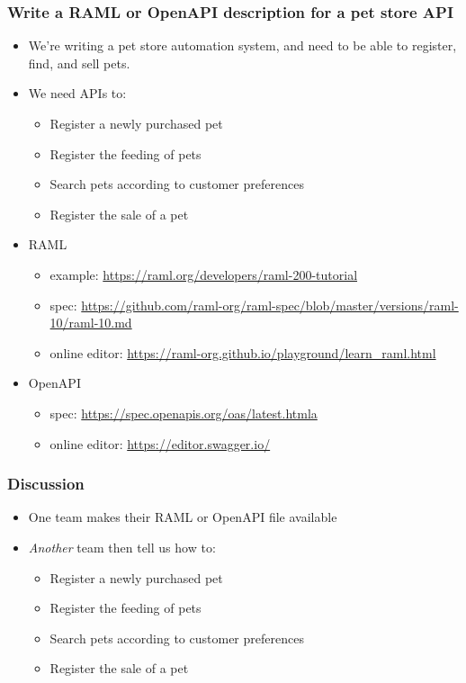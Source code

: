 \documentclass[8pt]{article}
\begin{document}
\subsubsection{Write a RAML or OpenAPI description for a pet store API}
\label{sec:org7547e2c}
\begin{itemize}
\item We're writing a pet store automation system, and need to be able to register, find, and sell pets.

\item We need APIs to:
\begin{itemize}
\item Register a newly purchased pet
\item Register the feeding of pets
\item Search pets according to customer preferences
\item Register the sale of a pet
\end{itemize}

\item RAML
\begin{itemize}
\item example: \url{https://raml.org/developers/raml-200-tutorial}
\item spec: \url{https://github.com/raml-org/raml-spec/blob/master/versions/raml-10/raml-10.md}
\item online editor: \url{https://raml-org.github.io/playground/learn\_raml.html}
\end{itemize}
\item OpenAPI
\begin{itemize}
\item spec: \url{https://spec.openapis.org/oas/latest.htmla}
\item online editor: \url{https://editor.swagger.io/}
\end{itemize}
\end{itemize}
\subsubsection{Discussion}
\label{sec:org1e84d21}
\begin{itemize}
\item One team makes their RAML or OpenAPI file available
\item \emph{Another} team then tell us how to:
\begin{itemize}
\item Register a newly purchased pet
\item Register the feeding of pets
\item Search pets according to customer preferences
\item Register the sale of a pet
\end{itemize}
\end{itemize}
\end{document}
